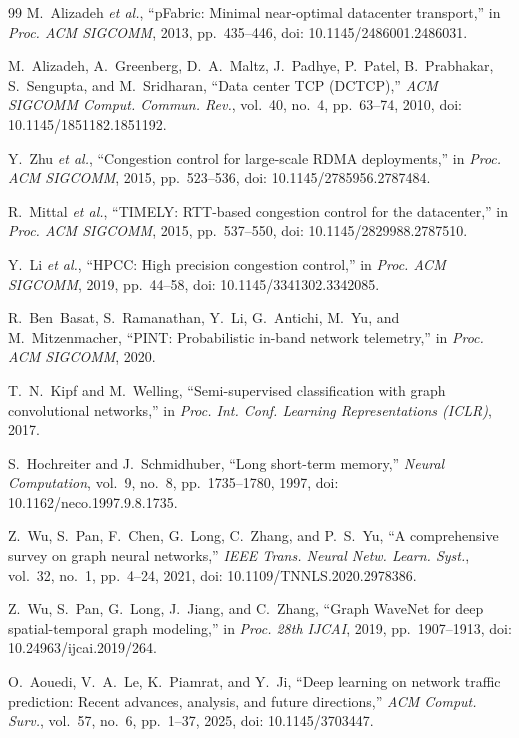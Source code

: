 \documentclass[conference]{IEEEtran}
\begin{document}
\begin{thebibliography}{99}
M.~Alizadeh \emph{et al.}, ``pFabric: Minimal near-optimal datacenter transport,'' in \emph{Proc. ACM SIGCOMM}, 2013, pp.~435--446, doi: 10.1145/2486001.2486031.

M.~Alizadeh, A.~Greenberg, D.~A.~Maltz, J.~Padhye, P.~Patel, B.~Prabhakar, S.~Sengupta, and M.~Sridharan, ``Data center TCP (DCTCP),'' \emph{ACM SIGCOMM Comput. Commun. Rev.}, vol.~40, no.~4, pp.~63--74, 2010, doi: 10.1145/1851182.1851192.

Y.~Zhu \emph{et al.}, ``Congestion control for large-scale RDMA deployments,'' in \emph{Proc. ACM SIGCOMM}, 2015, pp.~523--536, doi: 10.1145/2785956.2787484.

R.~Mittal \emph{et al.}, ``TIMELY: RTT-based congestion control for the datacenter,'' in \emph{Proc. ACM SIGCOMM}, 2015, pp.~537--550, doi: 10.1145/2829988.2787510.

Y.~Li \emph{et al.}, ``HPCC: High precision congestion control,'' in \emph{Proc. ACM SIGCOMM}, 2019, pp.~44--58, doi: 10.1145/3341302.3342085.

R.~Ben~Basat, S.~Ramanathan, Y.~Li, G.~Antichi, M.~Yu, and M.~Mitzenmacher, ``PINT: Probabilistic in-band network telemetry,'' in \emph{Proc. ACM SIGCOMM}, 2020.

T.~N.~Kipf and M.~Welling, ``Semi-supervised classification with graph convolutional networks,'' in \emph{Proc. Int. Conf. Learning Representations (ICLR)}, 2017.

S.~Hochreiter and J.~Schmidhuber, ``Long short-term memory,'' \emph{Neural Computation}, vol.~9, no.~8, pp.~1735--1780, 1997, doi: 10.1162/neco.1997.9.8.1735.

Z.~Wu, S.~Pan, F.~Chen, G.~Long, C.~Zhang, and P.~S.~Yu, ``A comprehensive survey on graph neural networks,'' \emph{IEEE Trans. Neural Netw. Learn. Syst.}, vol.~32, no.~1, pp.~4--24, 2021, doi: 10.1109/TNNLS.2020.2978386.

Z.~Wu, S.~Pan, G.~Long, J.~Jiang, and C.~Zhang, ``Graph WaveNet for deep spatial-temporal graph modeling,'' in \emph{Proc. 28th IJCAI}, 2019, pp.~1907--1913, doi: 10.24963/ijcai.2019/264.

O.~Aouedi, V.~A.~Le, K.~Piamrat, and Y.~Ji, ``Deep learning on network traffic prediction: Recent advances, analysis, and future directions,'' \emph{ACM Comput. Surv.}, vol.~57, no.~6, pp.~1--37, 2025, doi: 10.1145/3703447.


\end{thebibliography}
\end{document}
